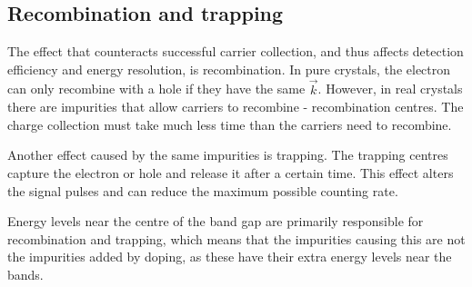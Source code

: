 \subsection{Recombination and trapping}
The effect that counteracts successful carrier collection, and thus affects detection efficiency and energy resolution, is recombination. In pure crystals, the electron can only recombine with a hole if they have the same $\vec{k}$. However, in real crystals there are impurities that allow carriers to recombine - recombination centres. The charge collection must take much less time than the carriers need to recombine. 
\par
Another effect caused by the same impurities is trapping. The trapping centres capture the electron or hole and release it after a certain time. This effect alters the signal pulses and can reduce the maximum possible counting rate.
\par
Energy levels near the centre of the band gap are primarily responsible for recombination and trapping, which means that the impurities causing this are not the impurities added by doping, as these have their extra energy levels near the bands. 


